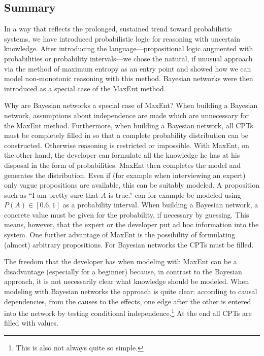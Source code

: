 \documentclass[10pt]{book}
\begin{document}
\subsection{Summary}
In a way that reflects the prolonged, sustained trend toward probabilistic systems, we have introduced probabilistic logic for reasoning with uncertain knowledge. After introducing the language—propositional logic augmented with probabilities or probability intervals—we chose the natural, if unusual approach via the method of maximum entropy as an entry point and showed how we can model non-monotonic reasoning with this method. Bayesian networks were then introduced as a special case of the MaxEnt method.

Why are Bayesian networks a special case of MaxEnt? When building a Bayesian network, assumptions about independence are made which are unnecessary for the MaxEnt method. Furthermore, when building a Bayesian network, all CPTs must be completely filled in so that a complete probability distribution can be constructed. Otherwise reasoning is restricted or impossible. With MaxEnt, on the other hand, the developer can formulate all the knowledge he has at his disposal in the form of probabilities. MaxEnt then completes the model and generates the distribution. Even if (for example when interviewing an expert) only vague propositions are available, this can be suitably modeled. A proposition such as ``I am pretty sure that $A$ is true.'' can for example be modeled using $P(A) \in[0.6,1]$ as a probability interval. When building a Bayesian network, a concrete value must be given for the probability, if necessary by guessing. This means, however, that the expert or the developer put ad hoc information into the system. One further advantage of MaxEnt is the possibility of formulating (almost) arbitrary propositions. For Bayesian networks the CPTs must be filled.

The freedom that the developer has when modeling with MaxEnt can be a disadvantage (especially for a beginner) because, in contrast to the Bayesian approach, it is not necessarily clear what knowledge should be modeled. When modeling with Bayesian networks the approach is quite clear: according to causal dependencies, from the causes to the effects, one edge after the other is entered into the network by testing conditional independence.\footnote{This is also not always quite so simple.} At the end all CPTs are filled with values.
\end{document}
